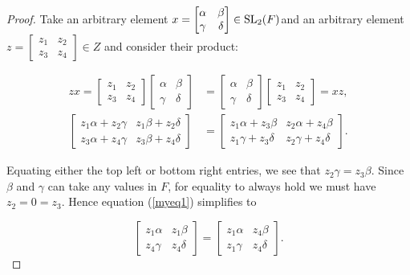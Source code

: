 \begin{proof} Take an arbitrary element $x=\begin{bmatrix} \alpha & \beta \\ \gamma & \delta \end{bmatrix} \in \operatorname{SL}_2(F)$and  an arbitrary element $z = \begin{bmatrix} z_1 & z_2 \\ z_3 & z_4 \end{bmatrix} \in Z$ and consider their product:

\begin{align}\label{myeq1} zx = \begin{bmatrix} z_1 & z_2 \\ z_3 & z_4 \end{bmatrix} \begin{bmatrix} \alpha & \beta \\ \gamma & \delta \end{bmatrix} &= \begin{bmatrix} \alpha & \beta \\ \gamma & \delta \end{bmatrix} \begin{bmatrix} z_1 & z_2 \\ z_3 & z_4 \end{bmatrix} = xz, \nonumber \\[1.5ex]
\begin{bmatrix} z_1 \alpha + z_2 \gamma & z_1 \beta + z_2 \delta \\ z_3 \alpha + z_4 \gamma & z_3 \beta + z_4 \delta \end{bmatrix} &= \begin{bmatrix} z_1 \alpha + z_3 \beta & z_2 \alpha + z_4 \beta \\ z_1 \gamma + z_3 \delta & z_2 \gamma + z_4 \delta \end{bmatrix}.
\end{align}

\noindent Equating either the top left or bottom right entries, we see that $z_2 \gamma = z_3 \beta$. Since $\beta$ and $\gamma$ can take any values in $F$, for equality to always hold we must have $z_2 = 0 = z_3$. Hence equation (\ref{myeq1}) simplifies to

\begin{equation*} \begin{bmatrix} z_1 \alpha & z_1 \beta \\ z_4 \gamma & z_4 \delta \end{bmatrix} = \begin{bmatrix} z_1 \alpha & z_4 \beta \\ z_1 \gamma & z_4 \delta \end{bmatrix}. \end{equation*}


\end{proof}
